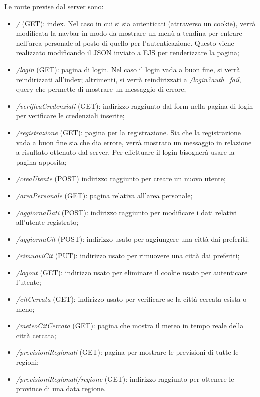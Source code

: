 Le route previse dal server sono:
\begin{itemize}
    \item \emph{/} (GET): index. Nel caso in cui si sia autenticati (attraverso un cookie), verrà modificata la 
    navbar in modo da mostrare un menù a tendina per entrare nell'area personale al posto di quello per l'autenticazione. 
    Questo viene realizzato modificando il JSON inviato a EJS per renderizzare la pagina;
    \item \emph{/login} (GET): pagina di login. Nel caso il login vada a buon fine, si verrà reindirizzati all'index; altrimenti, 
    si verrà reindirizzati a \emph{/login?auth=fail}, query che permette di mostrare un messaggio di errore;
    \item \emph{/verificaCredenziali} (GET): indirizzo raggiunto dal form nella pagina di login per verificare le credenziali 
    inserite;
    \item \emph{/registrazione} (GET): pagina per la registrazione. Sia che la registrazione vada a buon fine sia che dia errore, 
    verrà mostrato un messaggio in relazione a risultato ottenuto dal server. Per effettuare il login bisognerà usare la pagina 
    apposita;
    \item \emph{/creaUtente} (POST) indirizzo raggiunto per creare un nuovo utente;
    \item \emph{/areaPersonale} (GET): pagina relativa all'area personale;
    \item \emph{/aggiornaDati} (POST): indirizzo raggiunto per modificare i dati relativi all'utente registrato;
    \item \emph{/aggiornaCit} (POST): indirizzo usato per aggiungere una città dai preferiti;
    \item \emph{/rimuoviCit} (PUT): indirizzo usato per rimuovere una città dai preferiti;
    \item \emph{/logout} (GET): indirizzo usato per eliminare il cookie usato per autenticare l'utente;
    \item \emph{/citCercata} (GET): indirizzo usato per verificare se la città cercata esista o meno;
    \item \emph{/meteoCitCercata} (GET): pagina che mostra il meteo in tempo reale della città cercata;
    \item \emph{/previsioniRegionali} (GET): pagina per mostrare le previsioni di tutte le regioni;
    \item \emph{/previsioniRegionali/regione} (GET): indirizzo raggiunto per ottenere le province di una data regione.
\end{itemize}

